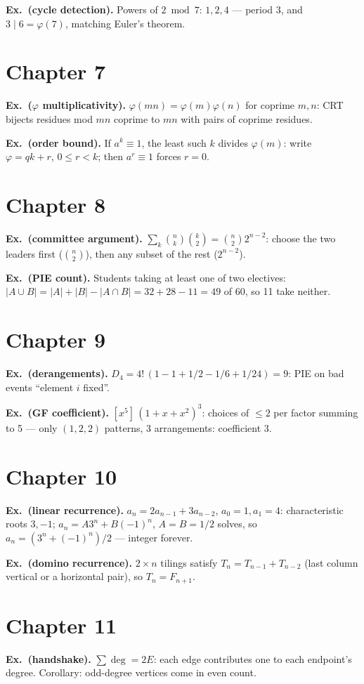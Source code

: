 \textbf{Ex.~(cycle detection).} Powers of $2\bmod7$: $1,2,4$ ---
period 3, and $3\mid6=\varphi(7)$, matching Euler's theorem.

\section*{Chapter 7}
\textbf{Ex.~($\varphi$ multiplicativity).}
$\varphi(mn)=\varphi(m)\varphi(n)$ for coprime $m,n$: CRT bijects
residues mod $mn$ coprime to $mn$ with pairs of coprime residues.

\textbf{Ex.~(order bound).} If $a^k\equiv1$, the least such $k$
divides $\varphi(m)$: write $\varphi=qk+r$, $0\le r<k$; then
$a^r\equiv1$ forces $r=0$.

\section*{Chapter 8}
\textbf{Ex.~(committee argument).} $\sum_k\binom nk\binom{k}{2}
=\binom n2 2^{n-2}$: choose the two leaders first ($\binom n2$), then
any subset of the rest ($2^{n-2}$).

\textbf{Ex.~(PIE count).} Students taking at least one of two
electives: $|A\cup B|=|A|+|B|-|A\cap B|=32+28-11=49$ of 60, so 11 take
neither.

\section*{Chapter 9}
\textbf{Ex.~(derangements).} $D_4=4!\,(1-1+1/2-1/6+1/24)=9$: PIE on
bad events ``element $i$ fixed''.

\textbf{Ex.~(GF coefficient).} $[x^5]\,(1+x+x^2)^3$: choices of
$\le2$ per factor summing to 5 --- only $(1,2,2)$ patterns, $3$
arrangements: coefficient $3$.

\section*{Chapter 10}
\textbf{Ex.~(linear recurrence).} $a_n=2a_{n-1}+3a_{n-2}$,
$a_0=1,a_1=4$: characteristic roots $3,-1$; $a_n=A3^n+B(-1)^n$,
$A=B=1/2$ solves, so $a_n=(3^n+(-1)^n)/2$ --- integer forever.

\textbf{Ex.~(domino recurrence).} $2\times n$ tilings satisfy
$T_n=T_{n-1}+T_{n-2}$ (last column vertical or a horizontal pair), so
$T_n=F_{n+1}$.

\section*{Chapter 11}
\textbf{Ex.~(handshake).} $\sum\deg=2E$: each edge contributes one to
each endpoint's degree. Corollary: odd-degree vertices come in even
count.

